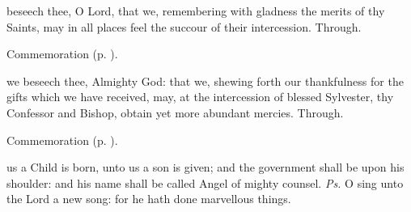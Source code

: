
\vspace{-0.25\baselineskip}

\secret

\vspace{-0.1\baselineskip}

 beseech thee, O Lord, that we, remembering with gladness the merits of thy Saints, may in all places feel the succour of their intercession. Through.


\begin{rubric}
    Commemoration  (p. \pageref{NativityMassIIIPostcommunion}).
\end{rubric}


\vspace{-0.25\baselineskip}

\postcommunion

\vspace{-0.05\baselineskip}

 we beseech thee, Almighty God: that we, shewing forth our thankfulness for the gifts which we have received, may, at the intercession of blessed Sylvester, thy Confessor and Bishop, obtain yet more abundant mercies. Through.


\begin{rubric}
    Commemoration  (p. \pageref{NativityMassIIIPostcommunion}).
\end{rubric}


\clearpage
{}\label{Circumcision}

\introit
{} us a Child is born, unto us a son is given; and the government shall be upon his shoulder: and his name shall be called Angel of mighty counsel. \textit{Ps.} O sing unto the Lord a new song: for he hath done marvellous things.

